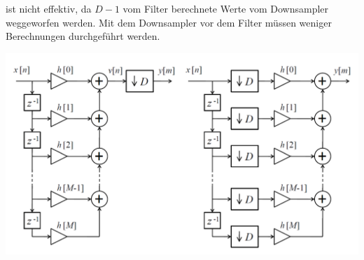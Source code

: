 ist nicht effektiv, da $D-1$ vom Filter berechnete Werte vom Downsampler
weggeworfen werden. Mit dem Downsampler vor dem Filter müssen weniger
Berechnungen durchgeführt werden.
\begin{center}
	\includegraphics[scale=.7]{./images/decimation_scheme}
\end{center}

